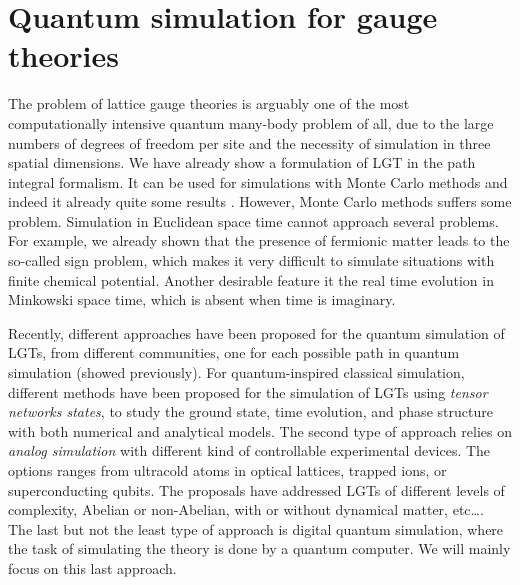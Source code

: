 \section{Quantum simulation for gauge theories}
\label{sec:quantum_simulation_for_gauge_theories}


The problem of lattice gauge theories is arguably one of the most computationally intensive quantum many-body problem of all, due to the large numbers of degrees of freedom per site and the necessity of simulation in three spatial dimensions.
We have already show a formulation of LGT in the path integral formalism.
It can be used for simulations with Monte Carlo methods and indeed it already quite some results \citneeded.
However, Monte Carlo methods suffers some problem.
Simulation in Euclidean space time cannot approach several problems.
For example, we already shown that the presence of fermionic matter leads to the so-called sign problem, which makes it very difficult to simulate situations with finite chemical potential.
Another desirable feature it the real time evolution in Minkowski space time, which is absent when time is imaginary.

Recently, different approaches have been proposed for the quantum simulation of LGTs, from different communities, one for each possible path in quantum simulation (showed previously).
For quantum-inspired classical simulation, different methods have been proposed for the simulation of LGTs using \emph{tensor networks states}, to study the ground state, time evolution, and phase structure with both numerical and analytical models.
The second type of approach relies on \emph{analog simulation} with different kind of controllable experimental devices.
The options ranges from ultracold atoms in optical lattices\citneeded, trapped ions\citneeded, or superconducting qubits\citneeded.
The proposals have addressed LGTs of different levels of complexity, Abelian or non-Abelian, with or without dynamical matter, etc\dots.
The last but not the least type of approach is digital quantum simulation, where the task of simulating the theory is done by a quantum computer.
We will mainly focus on this last approach.

